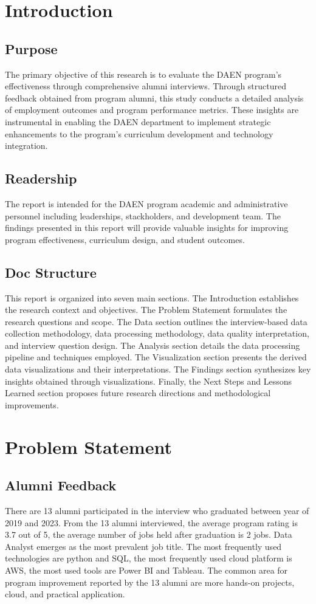 \documentclass[12pt,a4paper]{article}
\begin{document}
\section{Introduction}
\subsection{Purpose}
The primary objective of this research is to evaluate the DAEN 
program's effectiveness through comprehensive alumni interviews. Through structured feedback 
obtained from program alumni, this study conducts a 
detailed analysis of employment outcomes and program performance 
metrics. These insights are instrumental in enabling the DAEN 
department to implement strategic enhancements to the program's curriculum development and technology integration.

\subsection{Readership}
The report is intended for the DAEN program academic and 
administrative personnel including leaderships, stackholders, 
and development team. The findings presented in this report will provide valuable insights for improving program effectiveness, curriculum design, and student outcomes.

\subsection{Doc Structure}
This report is organized into seven main sections. The Introduction 
establishes the research context and objectives. The Problem 
Statement formulates the research questions and scope. 
The Data section outlines the interview-based data collection 
methodology, data processing methodology, data quality interpretation, and interview question design. The Analysis section details the data 
processing pipeline and techniques employed. The Visualization section presents the derived data visualizations 
and their interpretations. The Findings section synthesizes key 
insights obtained through visualizations. Finally, the Next 
Steps and Lessons Learned section proposes future research 
directions and methodological improvements.

\section{Problem Statement}
\subsection{Alumni Feedback}
There are 13 alumni participated in the interview who graduated between year of 2019 and 2023. From the 13 alumni interviewed, the average program rating is 3.7 out of 5, the average number of jobs held after graduation is 2 jobs. Data Analyst emerges as the most prevalent job title. The most frequently used technologies are python and SQL, the most frequently used cloud platform is AWS, the most used tools are Power BI and Tableau. The common area for program improvement reported by the 13 alumni are more hands-on projects, cloud, and practical application. 
\end{document}
